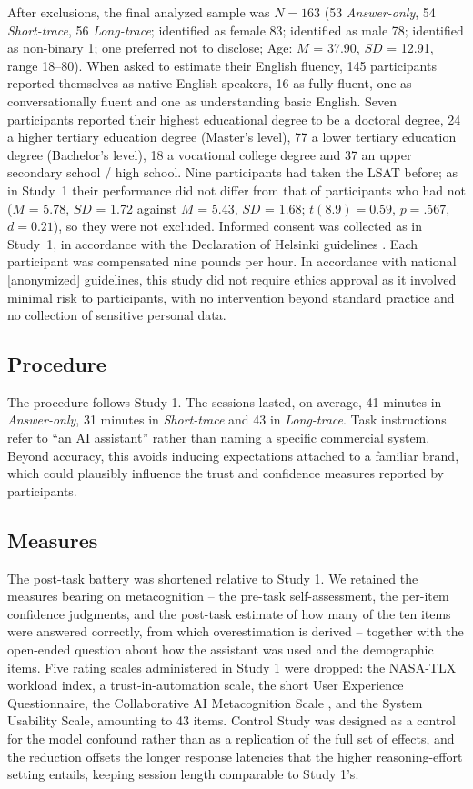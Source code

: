 \documentclass[manuscript,review,anonymous]{acmart}
\begin{document}
After exclusions, the final analyzed sample was $N = 163$ (53 \textit{Answer-only}, 54 \textit{Short-trace}, 56 \textit{Long-trace};
identified as female 83; identified as male 78; identified as non-binary 1; one
preferred not to disclose; Age: $M$ = 37.90, $SD$ = 12.91, range 18--80). When
asked to estimate their English fluency, 145 participants reported themselves as
native English speakers, 16 as fully fluent, one as conversationally fluent and
one as understanding basic English. Seven participants reported their highest
educational degree to be a doctoral degree, 24 a higher tertiary education degree
(Master's level), 77 a lower tertiary education degree (Bachelor's level), 18 a
vocational college degree and 37 an upper secondary school / high school. Nine
participants had taken the LSAT before; as in Study~1 their performance did not
differ from that of participants who had not ($M$ = 5.78, $SD$ = 1.72 against
$M$ = 5.43, $SD$ = 1.68; $t(8.9) = 0.59$, $p = .567$, $d = 0.21$), so they were
not excluded. Informed consent was collected as in Study~1, in accordance with the Declaration of Helsinki guidelines \cite{world2013world}. Each participant was compensated nine pounds per hour. In accordance with national [anonymized] guidelines, this study did not require ethics approval as it involved minimal risk to participants, with no intervention beyond standard practice and no collection of sensitive personal data. 




\subsection{Procedure}
The procedure follows Study 1. The sessions lasted, on average, 41 minutes in \textit{Answer-only}, 31 minutes in \textit{Short-trace} and
43 in \textit{Long-trace}. Task instructions refer to ``an AI assistant'' rather than naming a specific
commercial system. Beyond accuracy, this avoids inducing
expectations attached to a familiar brand, which could plausibly influence the
trust and confidence measures reported by participants.

\subsection{Measures}\label{sec:study2_measures}
The post-task battery was shortened relative to Study 1. We retained the measures
bearing on metacognition -- the pre-task self-assessment, the per-item confidence
judgments, and the post-task estimate of how many of the ten items were answered
correctly, from which overestimation is derived -- together with the open-ended
question about how the assistant was used and the demographic items. Five rating
scales administered in Study 1 were dropped: the NASA-TLX workload index, a
trust-in-automation scale, the short User Experience Questionnaire, the
Collaborative AI Metacognition Scale \cite{Sidra03042026}, and the System
Usability Scale, amounting to 43 items. Control Study was designed as a control for the
model confound rather than as a replication of the full set of effects, and the
reduction offsets the longer response latencies that the higher reasoning-effort
setting entails, keeping session length comparable to Study 1's.
\end{document}
